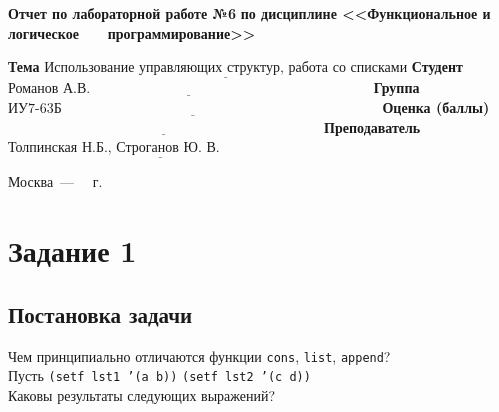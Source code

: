 \documentclass[12pt]{report}
\begin{document}
\begin{titlepage}
		\begin{center}
			\noindent\begin{minipage}{1.1\textwidth}\centering
				\Large\textbf{  Отчет по лабораторной работе №6}\newline
				\textbf{по дисциплине <<Функциональное и логическое}\newline
				\textbf{~~~программирование>>}\newline\newline
			\end{minipage}
		\end{center}
		
		\noindent\textbf{Тема} $\underline{\text{Использование управляющих структур, работа со списками}}$\newline\newline
		\noindent\textbf{Студент} $\underline{\text{Романов А.В.~~~~~~~~~~~~~~~~~~~~~~~~~~~~~~~~~~~~~~~~~~~~~~~~~~~~~~~~~~~~}}$\newline\newline
		\noindent\textbf{Группа} $\underline{\text{ИУ7-63Б~~~~~~~~~~~~~~~~~~~~~~~~~~~~~~~~~~~~~~~~~~~~~~~~~~~~~~~~~~~~~~~~~~~~}}$\newline\newline
		\noindent\textbf{Оценка (баллы)} $\underline{\text{~~~~~~~~~~~~~~~~~~~~~~~~~~~~~~~~~~~~~~~~~~~~~~~~~~~~~~~~~~~~~~~~~~~}}$\newline\newline
		\noindent\textbf{Преподаватель} $\underline{\text{Толпинская Н.Б., Строганов Ю. В.~~~~~~~~~~~~~~~~~~~~}}$\newline\newline\newline
		
		\begin{center}
			\vfill
			Москва~---~\the\year
			~г.
		\end{center}
	\end{titlepage}
	
	
\section*{Задание 1}
\subsection*{Постановка задачи}
Чем принципиально отличаются функции \texttt{cons}, \texttt{list}, \texttt{append}?\\
\indent Пусть \texttt{(setf lst1 '(a b))} \texttt{(setf lst2 '(c d))}\\
\indent Каковы результаты следующих выражений?
\end{document}
